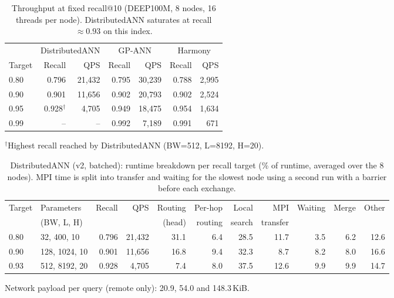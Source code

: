 
\begin{table}[t]
\centering
\caption{Throughput at fixed recall@10 (DEEP100M, 8 nodes, 16 threads per node).
DistributedANN saturates at recall $\approx 0.93$ on this index.}
\label{tab:qps-fixed-recall}
\small
\setlength{\tabcolsep}{3pt}
\begin{tabular}{lrrrrrr}
\toprule
 & \multicolumn{2}{c}{DistributedANN} & \multicolumn{2}{c}{GP-ANN} & \multicolumn{2}{c}{Harmony} \\
\cmidrule(lr){2-3}\cmidrule(lr){4-5}\cmidrule(lr){6-7}
Target & Recall & QPS & Recall & QPS & Recall & QPS \\
\midrule
0.80 & 0.796 & 21{,}432 & 0.795 & 30{,}239 & 0.788 & 2{,}995 \\
0.90 & 0.901 & 11{,}656 & 0.902 & 20{,}793 & 0.902 & 2{,}524 \\
0.95 & 0.928$^{\dagger}$ & 4{,}705 & 0.949 & 18{,}475 & 0.954 & 1{,}634 \\
0.99 & -- & -- & 0.992 & 7{,}189 & 0.991 & 671 \\
\bottomrule
\end{tabular}

\vspace{2pt}
{\footnotesize $^{\dagger}$Highest recall reached by DistributedANN (BW=512, L=8192, H=20).}
\end{table}

\begin{table}[t]
\centering
\caption{DistributedANN (v2, batched): runtime breakdown per recall target (\% of runtime, averaged over the 8 nodes).
MPI time is split into transfer and waiting for the slowest node using a second run with a barrier before each exchange.}
\label{tab:breakdown-dann}
\small
\begin{tabular}{llrrrrrrrrr}
\toprule
Target & Parameters & Recall & QPS & Routing & Per-hop & Local & MPI & Waiting & Merge & Other \\
 & (BW, L, H) & & & (head) & routing & search & transfer & & & \\
\midrule
0.80 & 32, 400, 10    & 0.796 & 21{,}432 & 31.1 & 6.4 & 28.5 & 11.7 & 3.5 & 6.2 & 12.6 \\
0.90 & 128, 1024, 10  & 0.901 & 11{,}656 & 16.8 & 9.4 & 32.3 & 8.7  & 8.2 & 8.0 & 16.6 \\
0.93 & 512, 8192, 20  & 0.928 & 4{,}705  & 7.4  & 8.0 & 37.5 & 12.6 & 9.9 & 9.9 & 14.7 \\
\bottomrule
\end{tabular}

\vspace{2pt}
{\footnotesize Network payload per query (remote only): 20.9, 54.0 and 148.3\,KiB.}
\end{table}

